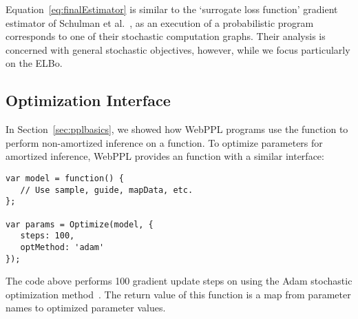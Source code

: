 Equation~\ref{eq:finalEstimator} is similar to the `surrogate loss function' gradient estimator of Schulman et al.~\cite{StochasticComputationGraphs}, as an execution of a probabilistic program corresponds to one of their stochastic computation graphs. Their analysis is concerned with general stochastic objectives, however, while we focus particularly on the ELBo.




\subsection{Optimization Interface}

In Section~\ref{sec:pplbasics}, we showed how WebPPL programs use the  function to perform non-amortized inference on a  function. To optimize parameters for amortized inference, WebPPL provides an  function with a similar interface:
\begin{lstlisting}
var model = function() {
   // Use sample, guide, mapData, etc.
};

var params = Optimize(model, {
   steps: 100,
   optMethod: 'adam'
});
\end{lstlisting}
The code above performs 100 gradient update steps on  using the Adam stochastic optimization method~\cite{Adam}.
The return value  of this function is a map from parameter names to optimized parameter values.
